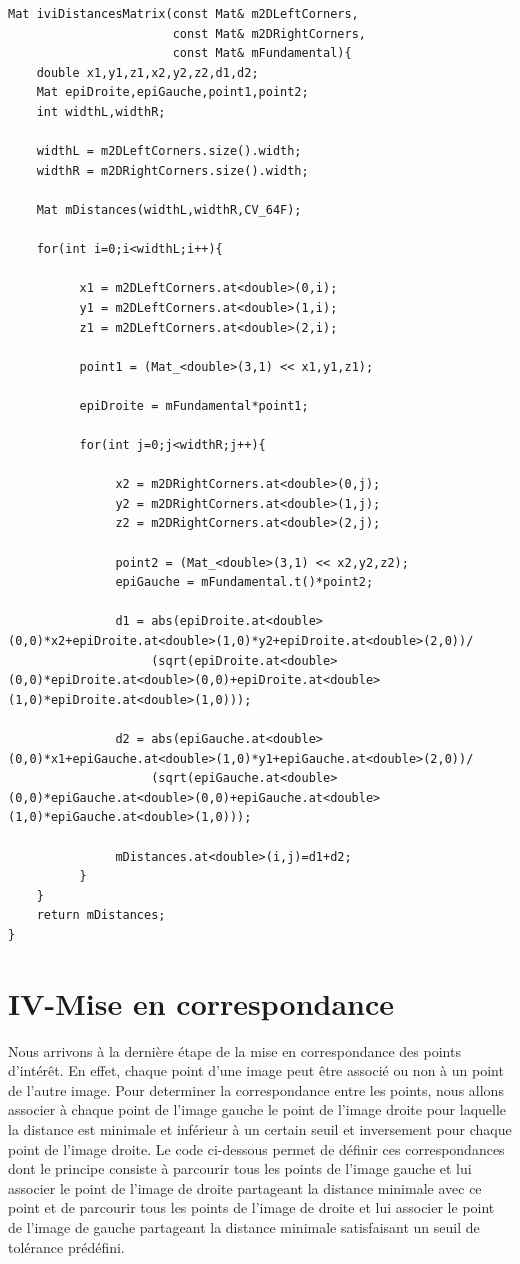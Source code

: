 \documentclass[a4paper,12pt]{report}
\begin{document}
\begin{lstlisting}[style=C++]
Mat iviDistancesMatrix(const Mat& m2DLeftCorners,
                       const Mat& m2DRightCorners,
                       const Mat& mFundamental){
    double x1,y1,z1,x2,y2,z2,d1,d2;
    Mat epiDroite,epiGauche,point1,point2;
    int widthL,widthR;

    widthL = m2DLeftCorners.size().width;
    widthR = m2DRightCorners.size().width;

    Mat mDistances(widthL,widthR,CV_64F);

    for(int i=0;i<widthL;i++){

          x1 = m2DLeftCorners.at<double>(0,i);
          y1 = m2DLeftCorners.at<double>(1,i);
          z1 = m2DLeftCorners.at<double>(2,i);

          point1 = (Mat_<double>(3,1) << x1,y1,z1);

          epiDroite = mFundamental*point1;

          for(int j=0;j<widthR;j++){

               x2 = m2DRightCorners.at<double>(0,j);
               y2 = m2DRightCorners.at<double>(1,j);
               z2 = m2DRightCorners.at<double>(2,j);

               point2 = (Mat_<double>(3,1) << x2,y2,z2);
               epiGauche = mFundamental.t()*point2;

               d1 = abs(epiDroite.at<double>(0,0)*x2+epiDroite.at<double>(1,0)*y2+epiDroite.at<double>(2,0))/
                    (sqrt(epiDroite.at<double>(0,0)*epiDroite.at<double>(0,0)+epiDroite.at<double>(1,0)*epiDroite.at<double>(1,0)));

               d2 = abs(epiGauche.at<double>(0,0)*x1+epiGauche.at<double>(1,0)*y1+epiGauche.at<double>(2,0))/
                    (sqrt(epiGauche.at<double>(0,0)*epiGauche.at<double>(0,0)+epiGauche.at<double>(1,0)*epiGauche.at<double>(1,0)));

               mDistances.at<double>(i,j)=d1+d2;
          }
    }
    return mDistances;
}
\end{lstlisting}
\section*{IV-Mise en correspondance}
\noindent Nous arrivons à la dernière étape de la mise en correspondance des points d'intérêt. En effet, chaque point d'une image peut être associé ou non à un point de l'autre image. Pour determiner la correspondance entre les points, nous allons associer à chaque point de l'image gauche le point de l'image droite pour laquelle la distance est minimale et inférieur à un certain seuil et inversement pour chaque point de l'image droite. Le code ci-dessous permet de définir ces correspondances dont le principe consiste à parcourir tous les points de l'image gauche et lui associer le point de l'image de droite partageant la distance minimale avec ce point et de parcourir tous les points de l'image de droite et lui associer le point de l'image de gauche partageant la distance minimale satisfaisant un seuil de tolérance prédéfini.
\end{document}
